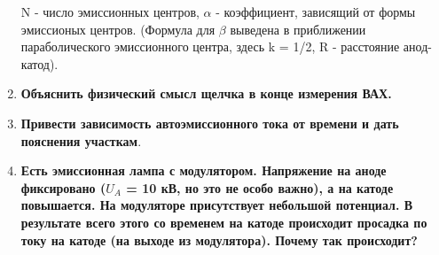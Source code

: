 \documentclass[a4paper]{article}
\begin{document}
\begin{enumerate}
	N - число эмиссионных центров, $\alpha$ - коэффициент, зависящий от формы эмиссионых центров. (Формула для
	$\beta$ выведена в приближении параболического эмиссионного центра, здесь k = 1/2, R - расстояние
	анод-катод).
	\item \textbf{Объяснить физический смысл щелчка в конце измерения ВАХ.}

	\item \textbf{Привести зависимость автоэмиссионного тока от времени и дать пояснения участкам}.
	
	\item \textbf{Есть эмиссионная лампа с модулятором. Напряжение на аноде фиксировано ($U_A$ = 10 кВ, 
	но это не особо важно), а на катоде повышается. На модуляторе присутствует небольшой потенциал. 
	В результате всего этого со временем на катоде происходит просадка по току на катоде (на выходе 
	из модулятора). Почему так происходит?}


\end{enumerate}
\end{document}
